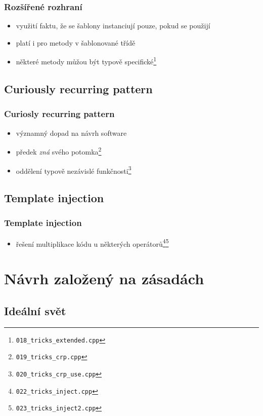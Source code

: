 	\begin{frame}
		\frametitle{Rozšířené rozhraní}
		\begin{itemize}
			\item{využití faktu, že se šablony instanciují pouze, pokud se použijí}
			\item{platí i pro metody v šablonované třídě}
			\item{některé metody můžou být typově specifické\footnote{\texttt{018\_tricks\_extended.cpp}}}
		\end{itemize}
	\end{frame}

	\subsection{Curiously recurring pattern}

	\begin{frame}
		\frametitle{Curiosly recurring pattern}
		\begin{itemize}
			\item{významný dopad na návrh software}
			\item{předek \textit{zná} svého potomka\footnote{\texttt{019\_tricks\_crp.cpp}}}
			\item{oddělení typově nezávislé funkčnosti\footnote{\texttt{020\_tricks\_crp\_use.cpp}}}
		\end{itemize}
	\end{frame}

	\subsection{Template injection}

	\begin{frame}
		\frametitle{Template injection}
		\begin{itemize}
			\item{řešení multiplikace kódu u některých operátorů\footnote{\texttt{022\_tricks\_inject.cpp}}\footnote{\texttt{023\_tricks\_inject2.cpp}}}
		\end{itemize}
	\end{frame}

	\section{Návrh založený na zásadách}
	\subsection{Ideální svět}

